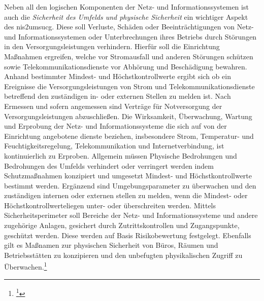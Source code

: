 \documentclass[11pt,a4paper,hidelinks]{article}   %
\begin{document}
                Neben all den logischen Komponenten der Netz- und Informationssystemen ist auch die \emph{Sicherheit des Umfelds und physische Sicherheit} ein wichtiger Aspekt des \gls{nis2umsucg}. Diese soll Verluste, Schäden oder Beeinträchtigungen von Netz- und Informationssystemen oder Unterbrechungen ihres Betriebs durch Störungen in den Versorgungsleistungen verhindern. Hierfür soll die Einrichtung Maßnahmen ergreifen, welche vor Stromausfall und anderen Störungen schützen sowie Telekommunikationsdienste vor Abhörung und Beschädigung bewahren. Anhand bestimmter Mindest- und Höchstkontrollwerte ergibt sich ob ein Ereignisse die Versorgungsleistungen von Strom und Telekommunikationsdienste betreffend den zuständigen in- oder externen Stellen zu melden ist. Nach Ermessen und sofern angemessen sind Verträge für Notversorgung der Versorgungsleistungen abzuschließen. Die Wirksamkeit, Überwachung, Wartung und Erprobung der Netz- und Informationssysteme die sich auf von der Einrichtung angebotene dienste beziehen, insbesondere Strom, Temperatur- und Feuchtigkeitsregelung, Telekommunikation und Internetverbindung, ist kontinuierlich zu Erproben. Allgemein müssen  Physische Bedrohungen und Bedrohungen des Umfelds verhindert oder verringert werden indem Schutzmaßnahmen konzipiert und umgesetzt Mindest- und Höchstkontrollwerte bestimmt werden. Ergänzend sind Umgebungsparameter zu überwachen und den zuständigen internen oder externen stellen zu melden, wenn die Mindest- oder Höchstkontrollwerteliegen unter- oder überschreiten werden. Mittels Sicherheitsperimeter soll Bereiche der Netz- und Informationssysteme und andere zugehörige Anlagen, gesichert durch Zutrittskontrollen und Zugangspunkte, geschützt werden. Diese werden auf Basis Risikobewertung festgelegt. Ebenfalls gilt es Maßnamen zur physischen Sicherheit von Büros, Räumen und Betriebsstätten zu konzipieren und den unbefugten physikalischen Zugriff zu Überwachen.\footnote{
                    \footcite[Vgl. Anhang, Nummer 13][]{EU2024-2690}
                }\medbreak
\end{document}
